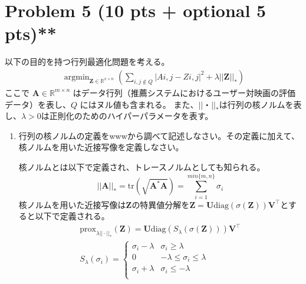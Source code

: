\documentclass{jsarticle}
\DeclareMathOperator*{\argmin}{argmin}
\begin{document}
\section*{Problem 5 (10 pts + optional 5 pts)**}
以下の目的を持つ行列最適化問題を考える。
\begin{align*}
  \argmin_{\bm Z\in\mathbb R^{x\times n}} \left( \sum_{i,j\notin Q} |Ai,j − Zi,j|^2 + λ||\bm Z||_*\right)
\end{align*}
ここで $\bm A \in \mathbb R^{m\times n}$ はデータ行列（推薦システムにおけるユーザー対映画の評価データ）を表し、$Q$ にはヌル値も含まれる。
また、$||・||_*$は行列の核ノルムを表し、$\lambda > 0$は正則化のためのハイパーパラメータを表す。
\begin{enumerate}
  \item 行列の核ノルムの定義をwwwから調べて記述しなさい。その定義に加えて、核ノルムを用いた近接写像を定義しなさい。
  
  核ノルムとは以下で定義され、トレースノルムとしても知られる。
  $$
  ||\bm A||_* = \mathrm{tr}(\sqrt{\bm A^*\bm A}) = \sum_{i=1}^{min\{m,n\}}\sigma_i
  $$
  核ノルムを用いた近接写像は$\bm Z$の特異値分解を$\bm Z = \bm U \mathrm{diag}(\sigma(\bm Z))\bm V^\top$とすると以下で定義される。
  \begin{align}
    \mathrm{prox}_{\lambda ||\cdot||_*}(\bm Z) = \bm U \mathrm{diag}(S_{\lambda}(\sigma(\bm Z)))\bm V^\top \\
    S_\lambda(\sigma_i) = \begin{cases}
      \sigma_i-\lambda & \sigma_i\ge\lambda \\
      0 &-\lambda\le\sigma_i\le\lambda \\
      \sigma_i+\lambda &\sigma_i\le-\lambda \\
    \end{cases}
  \end{align}


\end{enumerate}
\end{document}
